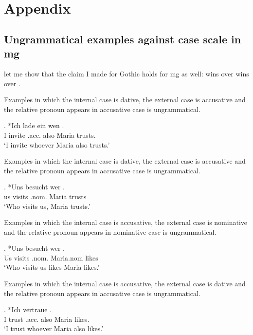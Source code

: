 
\chapter{Appendix}


\section{Ungrammatical examples against case scale in \ac{mg}}

let me show that the claim I made for Gothic holds for \ac{mg} as well:  wins over  wins over .

Examples in which the internal case is dative, the external case is accusative and the relative pronoun appears in accusative case is ungrammatical.

\exg. *Ich {lade ein} wen   . \\
 I invite\scsub{[acc]} .\ac{acc}. also Maria trusts\scsub{[dat]}.\\
 `I invite whoever Maria also trusts.' \label{ex:mg-acc-dat-u}

Examples in which the internal case is dative, the external case is accusative and the relative pronoun appears in accusative case is ungrammatical.

\exg. *Uns besucht wer  .\\
 us visits\scsub{[nom]} .\ac{nom}. Maria trusts\scsub{[dat]}\\
 `Who visits us, Maria trusts.' 

Examples in which the internal case is accusative, the external case is nominative and the relative pronoun appears in nominative case is ungrammatical.

\exg. *Uns besucht wer  .\\
 Us visits\scsub{[nom]} .\ac{nom}. Maria.\ac{nom} likes\scsub{[acc]}\\
 `Who visits us likes Maria likes.' \label{ex:mg-nom-acc-u}

Examples in which the internal case is accusative, the external case is dative and the relative pronoun appears in accusative case is ungrammatical.

\exg. *Ich vertraue    . \\
 I trust\scsub{[dat]} .\ac{acc}. also Maria likes\scsub{[acc]}.\\
 `I trust whoever Maria also likes.' 


